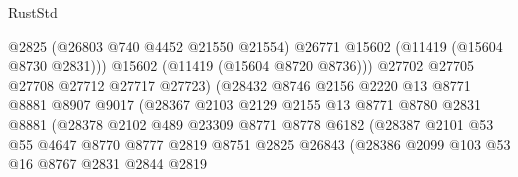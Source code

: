 \begin{lexlean}{RustStd}
\begin{coremodule}
                                      @2825
                                      (@26803 @740 @4452 @21550 @21554)
                                      @26771
                                      @15602
                                      (@11419 (@15604 @8730 @2831)))
                                    @15602
                                    (@11419 (@15604 @8720 @8736)))
                                  @27702
                                  @27705
                                  @27708
                                  @27712
                                  @27717
                                  @27723)
                                (@28432
                                  @8746
                                  @2156
                                  @2220
                                  @13
                                  @8771
                                  @8881
                                  @8907
                                  @9017
                                  (@28367
                                    @2103
                                    @2129
                                    @2155
                                    @13
                                    @8771
                                    @8780
                                    @2831
                                    @8881
                                    (@28378
                                      @2102
                                      @489
                                      @23309
                                      @8771
                                      @8778
                                      @6182
                                      (@28387
                                        @2101
                                        @53
                                        @55
                                        @4647
                                        @8770
                                        @8777
                                        @2819
                                        @8751
                                        @2825
                                        @26843
                                        (@28386
                                          @2099
                                          @103
                                          @53
                                          @16
                                          @8767
                                          @2831
                                          @2844
                                          @2819

\end{coremodule}
\end{lexlean}
